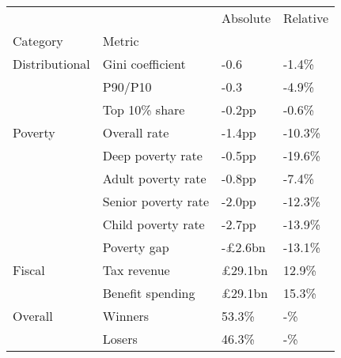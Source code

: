 \begin{tabular}{llll}
\toprule
        &        & Absolute & Relative \\
Category & Metric &          &          \\
\midrule
Distributional & Gini coefficient &     -0.6 &    -1.4\% \\
        & P90/P10 &     -0.3 &    -4.9\% \\
        & Top 10\% share &   -0.2pp &    -0.6\% \\
Poverty & Overall rate &   -1.4pp &   -10.3\% \\
        & Deep poverty rate &   -0.5pp &   -19.6\% \\
        & Adult poverty rate &   -0.8pp &    -7.4\% \\
        & Senior poverty rate &   -2.0pp &   -12.3\% \\
        & Child poverty rate &   -2.7pp &   -13.9\% \\
        & Poverty gap &  -£2.6bn &   -13.1\% \\
Fiscal & Tax revenue &  £29.1bn &    12.9\% \\
        & Benefit spending &  £29.1bn &    15.3\% \\
Overall & Winners &    53.3\% &       -\% \\
        & Losers &    46.3\% &       -\% \\
\bottomrule
\end{tabular}
